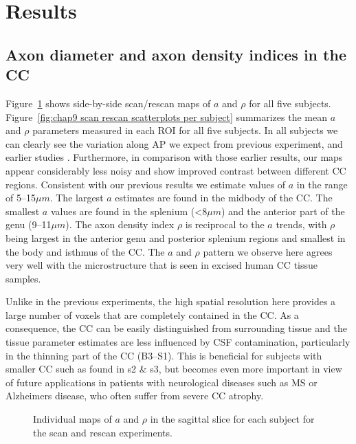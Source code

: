 \FloatBarrier
\section{Results}
\subsection{Axon diameter and axon density indices in the CC}
Figure~\ref{fig:chap9 scan rescan maps per subject} shows side-by-side scan/rescan maps of $a$ and $\rho$ for all five subjects. Figure~\ref{fig:chap9 scan rescan scatterplots per subject} summarizes the mean $a$ and $\rho$ parameters measured in each \gls{ROI} for all five subjects. In all subjects we can clearly see the variation along AP we expect from previous experiment, and earlier studies \citep{Alexander:2010}. Furthermore, in comparison with those earlier results, our maps appear considerably less noisy and show improved contrast between different \gls{CC} regions. Consistent with our previous results we estimate values of $a$ in the range of 5--15$\mu m$. The largest $a$ estimates are found in the midbody of the \gls{CC}. The smallest $a$ values are found in the splenium (<8$\mu m$) and the anterior part of the genu (9--11$\mu m$). The axon density index $\rho$ is reciprocal to the $a$ trends, with $\rho$ being largest in the anterior genu and posterior splenium regions and smallest in the body and isthmus of the \gls{CC}. The $a$ and $\rho$ pattern we observe here agrees very well with the microstructure that is seen in excised human \gls{CC} tissue samples.


Unlike in the previous experiments, the high spatial resolution here provides a large number of voxels that are completely contained in the \gls{CC}. As a consequence, the \gls{CC} can be easily distinguished from surrounding tissue and the tissue parameter estimates are less influenced by CSF contamination, particularly in the thinning part of the \gls{CC} (B3--S1). This is beneficial for subjects with smaller \gls{CC} such as found in s2 \& s3, but becomes even more important in view of future applications in patients with neurological diseases such as MS or Alzheimers disease, who often suffer from severe \gls{CC} atrophy. 
\begin{figure}[ht]
	\centering
	\caption{Individual maps of $a$ and $\rho$ in the sagittal slice for each subject for the scan and rescan experiments.}
	\label{fig:chap9 scan rescan maps per subject}
\end{figure}

